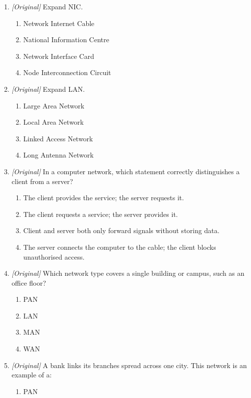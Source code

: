 \begin{enumerate}[label=\textbf{Q\arabic*.}, leftmargin=*]
\item \textit{[Original]} Expand NIC.
  \begin{enumerate}[label=\Alph*.]
    \item Network Internet Cable
    \item National Information Centre
    \item Network Interface Card
    \item Node Interconnection Circuit
  \end{enumerate}
\item \textit{[Original]} Expand LAN.
  \begin{enumerate}[label=\Alph*.]
    \item Large Area Network
    \item Local Area Network
    \item Linked Access Network
    \item Long Antenna Network
  \end{enumerate}
\item \textit{[Original]} In a computer network, which statement correctly
  distinguishes a client from a server?
  \begin{enumerate}[label=\Alph*.]
    \item The client provides the service; the server requests it.
    \item The client requests a service; the server provides it.
    \item Client and server both only forward signals without storing data.
    \item The server connects the computer to the cable; the client blocks
      unauthorised access.
  \end{enumerate}
\item \textit{[Original]} Which network type covers a single building or
  campus, such as an office floor?
  \begin{enumerate}[label=\Alph*.]
    \item PAN
    \item LAN
    \item MAN
    \item WAN
  \end{enumerate}
\item \textit{[Original]} A bank links its branches spread across one city.
  This network is an example of a:
  \begin{enumerate}[label=\Alph*.]
    \item PAN

\end{enumerate}
\end{enumerate}
